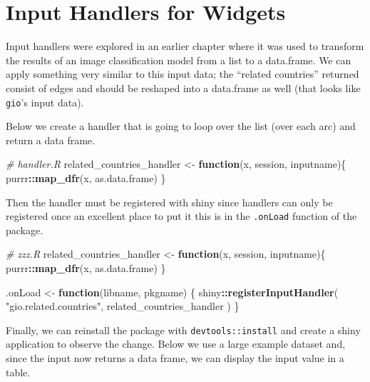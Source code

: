 \documentclass[10pt,]{krantz}
\makeatletter
\newenvironment{Shaded}{\begin{snugshade}}{\end{snugshade}}
\newcommand{\CommentTok}[1]{\textcolor[rgb]{0.37,0.37,0.37}{\textit{#1}}}
\newcommand{\ControlFlowTok}[1]{\textcolor[rgb]{0.27,0.27,0.27}{\textbf{#1}}}
\newcommand{\KeywordTok}[1]{\textcolor[rgb]{0.27,0.27,0.27}{\textbf{#1}}}
\newcommand{\NormalTok}[1]{#1}
\newcommand{\OperatorTok}[1]{\textcolor[rgb]{0.43,0.43,0.43}{\textbf{#1}}}
\newcommand{\StringTok}[1]{\textcolor[rgb]{0.5,0.5,0.5}{#1}}
\newenvironment{kframe}{%
\medskip{}
\setlength{\fboxsep}{.8em}
 \def\at@end@of@kframe{}%
 \ifinner\ifhmode%
  \def\at@end@of@kframe{\end{minipage}}%
  \begin{minipage}{\columnwidth}%
 \fi\fi%
 \def\FrameCommand##1{\hskip\@totalleftmargin \hskip-\fboxsep
 \colorbox{shadecolor}{##1}\hskip-\fboxsep
     \hskip-\linewidth \hskip-\@totalleftmargin \hskip\columnwidth}%
 \MakeFramed {\advance\hsize-\width
   \@totalleftmargin\z@ \linewidth\hsize
   \@setminipage}}%
 {\par\unskip\endMakeFramed%
 \at@end@of@kframe}
\renewenvironment{Shaded}{\begin{kframe}}{\end{kframe}}
\makeatother
\begin{document}
\hypertarget{shiny-widgets-handlers}{%
\section{Input Handlers for Widgets}\label{shiny-widgets-handlers}}

Input handlers were explored in an earlier chapter where it was used to transform the results of an image classification model from a list to a data.frame. We can apply something very similar to this input data; the ``related countries'' returned consist of edges and should be reshaped into a data.frame as well (that looks like \texttt{gio}'s input data).

Below we create a handler that is going to loop over the list (over each arc) and return a data frame.

\begin{Shaded}
\begin{Highlighting}[]
\CommentTok{# handler.R}
\NormalTok{related_countries_handler <-}\StringTok{ }\ControlFlowTok{function}\NormalTok{(x, session, inputname)\{}
\NormalTok{  purrr}\OperatorTok{::}\KeywordTok{map_dfr}\NormalTok{(x, as.data.frame)}
\NormalTok{\}}
\end{Highlighting}
\end{Shaded}

Then the handler must be registered with shiny since handlers can only be registered once an excellent place to put it this is in the \texttt{.onLoad} function of the package.

\begin{Shaded}
\begin{Highlighting}[]
\CommentTok{# zzz.R}
\NormalTok{related_countries_handler <-}\StringTok{ }\ControlFlowTok{function}\NormalTok{(x, session, inputname)\{}
\NormalTok{  purrr}\OperatorTok{::}\KeywordTok{map_dfr}\NormalTok{(x, as.data.frame)}
\NormalTok{\}}

\NormalTok{.onLoad <-}\StringTok{ }\ControlFlowTok{function}\NormalTok{(libname, pkgname) \{}
\NormalTok{  shiny}\OperatorTok{::}\KeywordTok{registerInputHandler}\NormalTok{(}
    \StringTok{"gio.related.countries"}\NormalTok{, }
\NormalTok{    related_countries_handler}
\NormalTok{  )}
\NormalTok{\}}
\end{Highlighting}
\end{Shaded}

Finally, we can reinstall the package with \texttt{devtools::install} and create a shiny application to observe the change. Below we use a large example dataset and, since the input now returns a data frame, we can display the input value in a table.
\end{document}
